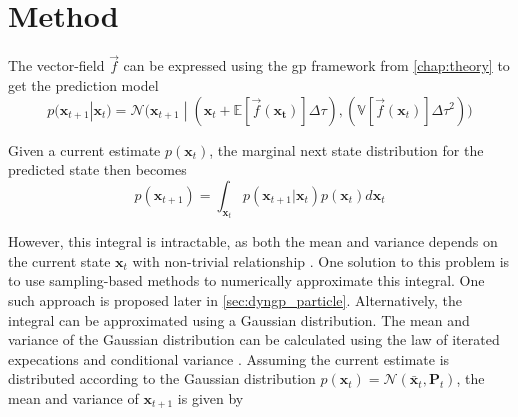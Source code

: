 \section{Method}

The vector-field $\vec{f}$ can be expressed using the \acrshort{gp} framework from \cref{chap:theory} to get the prediction model 
\begin{equation}
    p(\boldsymbol{x}_{t+1} | \boldsymbol{x}_t) = \mathcal{N}\big(\boldsymbol{x}_{t+1} \; | \; (\boldsymbol{x}_t + \mathbb{E}[\vec{f}(\boldsymbol{x_t})] \Delta \tau), (\mathbb{V}[\vec{f}(\boldsymbol{x}_t)] \Delta \tau^2) \big)
\end{equation}

Given a current estimate $p(\boldsymbol{x}_t)$, the marginal next state distribution for the predicted state then becomes 
\begin{equation}
    p(\boldsymbol{x}_{t+1}) = \int_{\boldsymbol{x}_t} p(\boldsymbol{x}_{t+1} | \boldsymbol{x}_t) p(\boldsymbol{x}_t) d\boldsymbol{x}_t
\end{equation} 

However, this integral is intractable, as both the mean and variance depends on the current state $\boldsymbol{x}_t$ with non-trivial relationship \cite{pedestrian,multistep_gp}. One solution to this problem is to use sampling-based methods to numerically approximate this integral. One such approach is proposed later in \cref{sec:dyngp_particle}. Alternatively, the integral can be approximated using a Gaussian distribution. The mean and variance of the Gaussian distribution can be calculated using the law of iterated expecations and conditional variance \cite{multistep_gp}. Assuming the current estimate is distributed according to the Gaussian distribution $p(\boldsymbol{x}_t) = \mathcal{N}(\bar{\boldsymbol{x}}_t, \boldsymbol{P}_t)$, the mean and variance of $\boldsymbol{x}_{t+1}$ is given by

